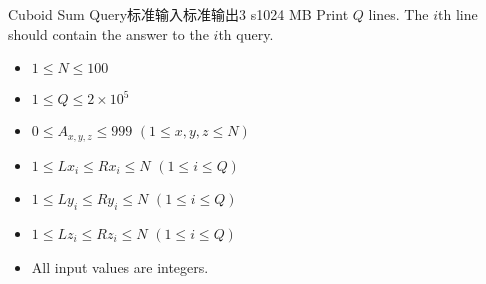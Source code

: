 \begin{problem}{Cuboid Sum Query}{标准输入}{标准输出}{3 s}{1024 MB}
\OutputFile
Print $Q$ lines. The $i$\-th line should contain the answer to the $i$\-th query.

\Example

\begin{example}
\end{example}

\Constraints

\begin{itemize}
    \item $1 \leq N \leq 100$
    \item $1 \leq Q \leq 2 \times 10^{5}$
    \item $0 \leq A_{x,y,z} \leq 999$ $(1 \leq x, y, z \leq N)$
    \item $1 \leq Lx_i \leq Rx_i \leq N$ $(1 \leq i \leq Q)$
    \item $1 \leq Ly_i \leq Ry_i \leq N$ $(1 \leq i \leq Q)$
    \item $1 \leq Lz_i \leq Rz_i \leq N$ $(1 \leq i \leq Q)$
    \item All input values are integers.
\end{itemize}

\end{problem}
